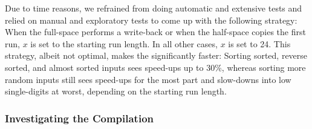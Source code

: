 Due to time reasons, we refrained from doing automatic and extensive tests and relied on manual and exploratory tests to come up with the following strategy:
When the full-space \MS{} performs a write-back or when the half-space \MS{} copies the first run, \(x\) is set to the starting run length.
In all other cases, \(x\) is set to 24.
This strategy, albeit not optimal, makes the \MS*{} significantly faster:
Sorting sorted, reverse sorted, and almost sorted inputs sees speed-ups up to 30\%, whereas sorting more random inputs still sees speed-ups for the most part and slow-downs into low single-digits at worst, depending on the starting run length.



\subsubsection*{Investigating the Compilation}

